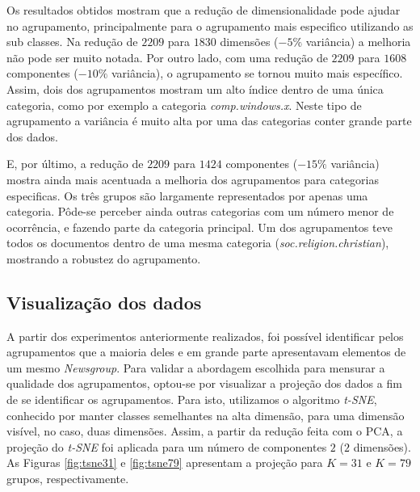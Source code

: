 \documentclass[conference]{IEEEtran}
\begin{document}
Os resultados obtidos mostram que a redução de dimensionalidade pode ajudar no agrupamento, principalmente para o agrupamento mais especifico utilizando as sub classes. Na redução de $2209$ para $1830$ dimensões ($-5\%$ variância) a melhoria não pode ser muito notada. Por outro lado, com uma redução de $2209$ para $1608$ componentes ($-10\%$ variância), o agrupamento se tornou muito mais específico. Assim, dois dos agrupamentos mostram um alto índice dentro de uma única categoria, como por exemplo a categoria \emph{comp.windows.x}. Neste tipo de agrupamento a variância é muito alta por uma das categorias conter grande parte dos dados.

E, por último, a redução de $2209$ para $1424$ componentes ($-15\%$ variância) mostra ainda mais acentuada a melhoria dos agrupamentos para categorias especificas. Os três grupos são largamente representados por apenas uma categoria. Pôde-se perceber ainda outras categorias com um número menor de ocorrência, e fazendo parte da categoria principal. Um dos agrupamentos teve todos os documentos dentro de uma mesma categoria (\emph{soc.religion.christian}), mostrando a robustez do agrupamento.

\subsection{Visualização dos dados}

A partir dos experimentos anteriormente realizados, foi possível identificar pelos agrupamentos que a maioria deles e em grande parte apresentavam elementos de um mesmo \emph{Newsgroup}. Para validar a abordagem escolhida para mensurar a qualidade dos agrupamentos, optou-se por visualizar a projeção dos dados a fim de se identificar os agrupamentos. Para isto, utilizamos o algoritmo \emph{t-SNE}, conhecido por manter classes semelhantes na alta dimensão, para uma dimensão visível, no caso, duas dimensões. Assim, a partir da redução feita com o PCA, a projeção do \emph{t-SNE} foi aplicada para um número de componentes $2$ ($2$ dimensões). As Figuras \ref{fig:tsne31} e \ref{fig:tsne79} apresentam a projeção para $K=31$ e $K=79$ grupos, respectivamente.
\end{document}
